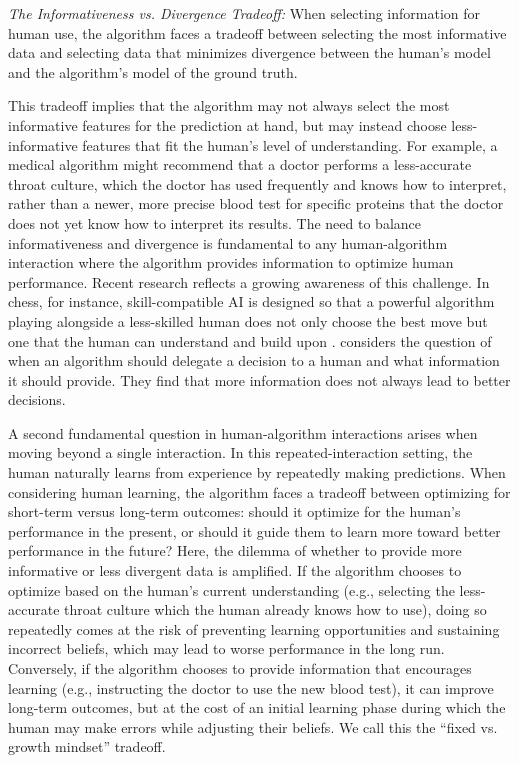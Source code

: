 \begin{tradeoff} \label{tradeoff1}
    {\em The Informativeness vs. Divergence Tradeoff:} When selecting information for human use, the algorithm faces a tradeoff between selecting the most informative data and selecting data that minimizes divergence %
    between the human's model and the algorithm's model of the ground truth. 
\end{tradeoff}


This tradeoff implies that the algorithm may not always select the most informative features for the prediction at hand, but may instead choose less-informative features that fit the human's level of understanding. For example, a medical algorithm might recommend that a doctor performs a less-accurate throat culture, which the doctor has used frequently and knows how to interpret, rather than a newer, more precise blood test for specific proteins that the doctor does not yet know how to interpret its results.
The need to balance informativeness and divergence is fundamental to any human-algorithm interaction where the algorithm provides information to optimize human performance. Recent research reflects a growing awareness of this challenge.
In chess, for instance, skill-compatible AI is designed so that a powerful algorithm playing alongside a less-skilled human does not only choose the best move but one that the human can understand and build upon \cite{hamade2024}. 
\cite{xu2024persuasion} considers the question of when an algorithm should delegate a decision to a human and what information it should provide. They find that more information does not always lead to better decisions. 


 A second fundamental question in human-algorithm interactions arises when moving beyond a single interaction. In this repeated-interaction setting, the human naturally learns from experience by repeatedly making predictions. 
When considering human learning, the algorithm faces a tradeoff between optimizing for short-term versus long-term outcomes: should it optimize for the human's performance in the present, or should it guide them to learn more toward better performance in the future? 
Here, the dilemma of whether to provide more informative or less divergent data is amplified. 
If the algorithm chooses to optimize based on the human's current understanding (e.g., selecting the less-accurate throat culture which the human already knows how to use), doing so repeatedly comes at the risk of preventing learning opportunities and sustaining incorrect beliefs, which may lead to worse performance in the long run. Conversely, if the algorithm chooses to provide information that encourages learning (e.g., instructing the doctor to use the new blood test), it can improve long-term outcomes, but at the cost of an initial learning phase  during which the human may make errors while adjusting their beliefs. We call this the ``fixed vs. growth mindset'' tradeoff. 


